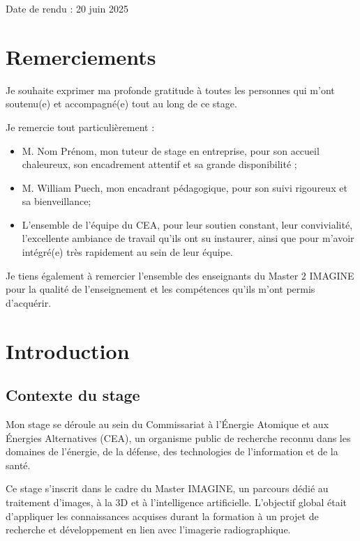 \documentclass[12pt,a4paper]{report}
\begin{document}
\begin{titlepage}
\begin{center}
\vfill
{\small Date de rendu : 20 juin 2025}

\end{center}
\end{titlepage}

\chapter*{Remerciements}

Je souhaite exprimer ma profonde gratitude à toutes les personnes qui m'ont soutenu(e) et accompagné(e) tout au long de ce stage.

Je remercie tout particulièrement :
\begin{itemize}
  \item M. Nom Prénom, mon tuteur de stage en entreprise, pour son accueil chaleureux, son encadrement attentif et sa grande disponibilité ;
  \item M. William Puech, mon encadrant pédagogique, pour son suivi rigoureux et sa bienveillance;
  \item L’ensemble de l’équipe du CEA, pour leur soutien constant, leur convivialité, l’excellente ambiance de travail qu’ils ont su instaurer, ainsi que pour m’avoir intégré(e) très rapidement au sein de leur équipe.
\end{itemize}

Je tiens également à remercier l’ensemble des enseignants du Master 2 IMAGINE pour la qualité de l’enseignement et les compétences qu’ils m’ont permis d’acquérir.

\tableofcontents
\pagestyle{fancy}
\newpage

\chapter{Introduction}
\section{Contexte du stage}
Mon stage se déroule au sein du Commissariat à l'Énergie Atomique et aux Énergies Alternatives (CEA), un organisme public de recherche reconnu dans les domaines de l'énergie, de la défense, des technologies de l'information et de la santé.

Ce stage s'inscrit dans le cadre du Master IMAGINE, un parcours dédié au traitement d'images, à la 3D et à l'intelligence artificielle. L'objectif global était d'appliquer les connaissances acquises durant la formation à un projet de recherche et développement en lien avec l'imagerie radiographique.
\end{document}

